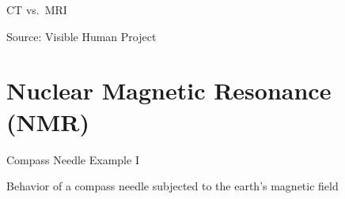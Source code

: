 \begin{frame}[c]{CT vs.~MRI}
    \begin{figure}
        \centering
    \end{figure}

    {\scriptsize *Source: Visible Human Project}
\end{frame}





\section{Nuclear Magnetic Resonance (NMR)}%
\label{sec:nuclear_magnetic_resonance_nmr}

\begin{frame}{Compass Needle Example I}

Behavior of a compass needle subjected to the earth's magnetic field

\begin{center}
\begingroup
{}%
\only<1>{}%
\only<2>{}%
\only<3>{}%
%
\endgroup
\end{center}

\end{frame}

